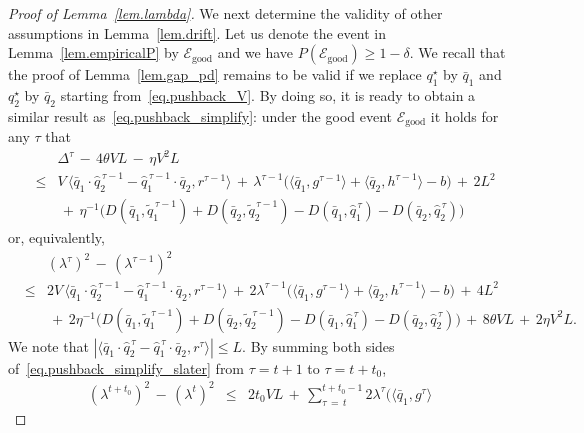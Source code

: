 \documentclass[12pt, final]{l4dc2023}
\begin{document}
\begin{proof}[Proof of Lemma~\ref{lem.lambda}]
	We next determine the validity of other assumptions in Lemma~\ref{lem.drift}. Let us denote the event in Lemma~\ref{lem.empiricalP} by $\mathcal{E}_{\text{good}}$ and we have $P(\mathcal{E}_{\text{good}}) \geq 1-\delta$.
	We recall that the proof of Lemma~\ref{lem.gap_pd} remains to be valid if we replace $q_1^\star$ by $\bar q_1$ and $q_2^\star$ by $\bar q_2$ starting from~\eqref{eq.pushback_V}. By doing so, it is ready to obtain a similar result as~\eqref{eq.pushback_simplify}: under the good event $\mathcal{E}_{\text{good}}$ it holds for any $\tau$ that
	\[
	\begin{array}{rcl}
	&& \!\!\!\! \!\!\!\! \!\! 
	\Delta^{\tau} \,-\,4\theta V L\,-\,\eta V^2 L
	\\[0.2cm]
	& \leq & V\, \big\langle{ \bar q_1\cdot \hat q_2^{\,\tau-1}-\hat q_1^{\,\tau-1}\cdot \bar q_2 },{r^{\tau-1}}\big\rangle 
	\,+\,
	\lambda^{\tau-1} \big(\langle{ \bar q_1},{g^{\tau-1}}\rangle 
	+ \langle{ \bar q_2},{h^{\tau-1}}\rangle -b\big)
	\,+\,2L^2
	\\[0.2cm]
	&& \,+\, \eta^{-1} \big(D(\bar q_1,\tilde q_1^{\,\tau-1}) + D( \bar q_2, \tilde q_2^{\,\tau-1}) -D( \bar q_1,\hat q_1^{\,\tau}) - D( \bar q_2, \hat q_2^{\,\tau}) \big)
	\end{array}
	\]
	or, equivalently,
	\begin{equation}\label{eq.pushback_simplify_slater}
	\begin{array}{rcl}
	&& \!\!\!\! \!\!\!\! \!\! 
	(\lambda^\tau)^2 \,-\, (\lambda^{\tau-1})^2
	\\[0.2cm]
	&\leq& 2V\, \big\langle{ \bar q_1\cdot \hat q_2^{\,\tau-1}-\hat q_1^{\,\tau-1}\cdot \bar q_2 },{r^{\tau-1}}\big\rangle 
	\,+\,
	2\lambda^{\tau-1} \big(\langle{ \bar q_1},{g^{\tau-1}}\rangle 
	+ \langle{ \bar q_2},{h^{\tau-1}}\rangle -b\big)
	\,+\,4L^2
	\\[0.2cm]
	&& \,+\, 2\eta^{-1} \big(D(\bar q_1,\tilde q_1^{\,\tau-1}) + D( \bar q_2, \tilde q_2^{\,\tau-1}) -D( \bar q_1,\hat q_1^{\,\tau}) - D( \bar q_2, \hat q_2^{\,\tau}) \big)
	\,+\,8\theta V L\,+\,2\eta V^2 L.
	\end{array}
	\end{equation}
	We note that $ |\langle{ \bar q_1\cdot \hat q_2^{\,\tau}-\hat q_1^{\,\tau}\cdot \bar q_2 },{r^{\tau}}\rangle|\leq L$. By summing both sides of~\eqref{eq.pushback_simplify_slater} from $\tau=t+1$ to $\tau=t+t_0$,
	\[
	\begin{array}{rcl}
	(\lambda^{t+t_0})^2 \,-\, (\lambda^{t})^2
	& \leq & \displaystyle 2t_0VL
	\,+\,\sum_{\tau\,=\,t}^{t+t_0-1} 
	2\lambda^{\tau} \big(\langle{ \bar q_1},{g^{\tau}}\rangle 

\end{array}\]
\end{proof}
\end{document}
